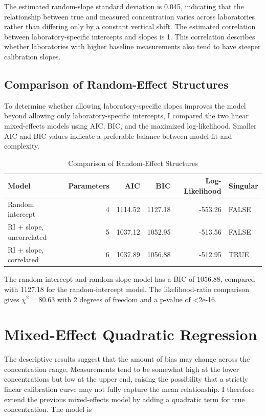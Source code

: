 \documentclass[
]{article}
\begin{document}
The estimated random-slope standard deviation is 0.045, indicating that
the relationship between true and measured concentration varies across
laboratories rather than differing only by a constant vertical shift.
The estimated correlation between laboratory-specific intercepts and
slopes is 1. This correlation describes whether laboratories with higher
baseline measurements also tend to have steeper calibration slopes.

\subsection{Comparison of Random-Effect
Structures}\label{comparison-of-random-effect-structures}

To determine whether allowing laboratory-specific slopes improves the
model beyond allowing only laboratory-specific intercepts, I compared
the two linear mixed-effects models using AIC, BIC, and the maximized
log-likelihood. Smaller AIC and BIC values indicate a preferable balance
between model fit and complexity.

\begin{table}[!h]
\centering
\caption{\label{tab:compare-random-effects}Comparison of Random-Effect Structures}
\centering
\begin{tabular}[t]{lrrrrl}
\toprule
Model & Parameters & AIC & BIC & Log-Likelihood & Singular\\
\midrule
Random intercept & 4 & 1114.52 & 1127.18 & -553.26 & FALSE\\
RI + slope, uncorrelated & 5 & 1037.12 & 1052.95 & -513.56 & FALSE\\
RI + slope, correlated & 6 & 1037.89 & 1056.88 & -512.95 & TRUE\\
\bottomrule
\end{tabular}
\end{table}

The random-intercept and random-slope model has a BIC of 1056.88,
compared with 1127.18 for the random-intercept model. The
likelihood-ratio comparison gives \(\chi^2 = 80.63\) with 2 degrees of
freedom and a p-value of \textless2e-16.

\section{Mixed-Effect Quadratic
Regression}\label{mixed-effect-quadratic-regression}

The descriptive results suggest that the amount of bias may change
across the concentration range. Measurements tend to be somewhat high at
the lower concentrations but low at the upper end, raising the
possibility that a strictly linear calibration curve may not fully
capture the mean relationship. I therefore extend the previous
mixed-effects model by adding a quadratic term for true concentration.
The model is
\end{document}
